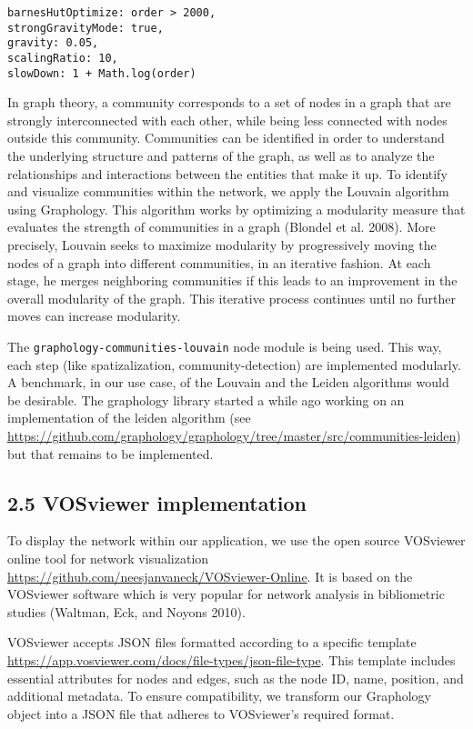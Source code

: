 \documentclass[
]{article}
\begin{document}
\begin{verbatim}
barnesHutOptimize: order > 2000,
strongGravityMode: true,
gravity: 0.05,
scalingRatio: 10,
slowDown: 1 + Math.log(order)
\end{verbatim}

In graph theory, a community corresponds to a set of nodes in a graph
that are strongly interconnected with each other, while being less
connected with nodes outside this community. Communities can be
identified in order to understand the underlying structure and patterns
of the graph, as well as to analyze the relationships and interactions
between the entities that make it up. To identify and visualize
communities within the network, we apply the Louvain algorithm using
Graphology. This algorithm works by optimizing a modularity measure that
evaluates the strength of communities in a graph (Blondel et al. 2008).
More precisely, Louvain seeks to maximize modularity by progressively
moving the nodes of a graph into different communities, in an iterative
fashion. At each stage, he merges neighboring communities if this leads
to an improvement in the overall modularity of the graph. This iterative
process continues until no further moves can increase modularity.

The \texttt{graphology-communities-louvain} node module is being used.
This way, each step (like spatizalization, community-detection) are
implemented modularly. A benchmark, in our use case, of the Louvain and
the Leiden algorithms would be desirable. The graphology library started
a while ago working on an implementation of the leiden algorithm (see
\url{https://github.com/graphology/graphology/tree/master/src/communities-leiden})
but that remains to be implemented.

\hypertarget{vosviewer-implementation}{%
\subsection{2.5 VOSviewer
implementation}\label{vosviewer-implementation}}

To display the network within our application, we use the open source
VOSviewer online tool for network visualization
\url{https://github.com/neesjanvaneck/VOSviewer-Online}. It is based on
the VOSviewer software which is very popular for network analysis in
bibliometric studies (Waltman, Eck, and Noyons 2010).

VOSviewer accepts JSON files formatted according to a specific template
\url{https://app.vosviewer.com/docs/file-types/json-file-type}. This
template includes essential attributes for nodes and edges, such as the
node ID, name, position, and additional metadata. To ensure
compatibility, we transform our Graphology object into a JSON file that
adheres to VOSviewer's required format.
\end{document}
